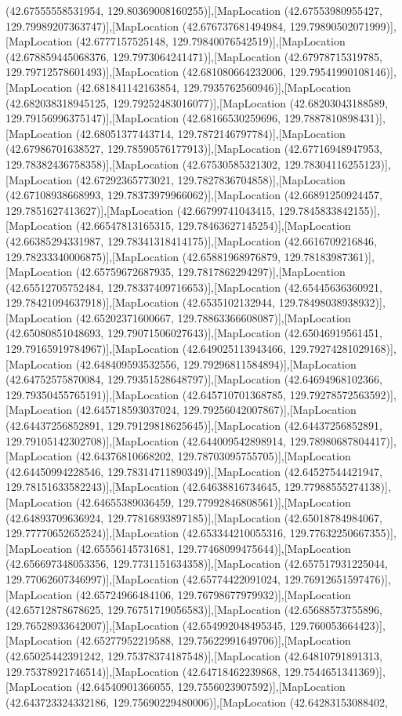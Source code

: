 (42.67555558531954, 129.80369008160255)],[MapLocation (42.67553980955427, 129.79989207363747)],[MapLocation (42.676737681494984, 129.79890502071999)],[MapLocation (42.6777157525148, 129.79840076542519)],[MapLocation (42.678859445068376, 129.7973064241471)],[MapLocation (42.67978715319785, 129.79712578601493)],[MapLocation (42.681080664232006, 129.79541990108146)],[MapLocation (42.681841142163854, 129.7935762560946)],[MapLocation (42.682038318945125, 129.79252483016077)],[MapLocation (42.68203043188589, 129.79156996375147)],[MapLocation (42.68166530259696, 129.7887810898431)],[MapLocation (42.68051377443714, 129.7872146797784)],[MapLocation (42.67986701638527, 129.78590576177913)],[MapLocation (42.67716948947953, 129.78382436758358)],[MapLocation (42.67530585321302, 129.78304116255123)],[MapLocation (42.67292365773021, 129.7827836704858)],[MapLocation (42.67108938668993, 129.78373979966062)],[MapLocation (42.66891250924457, 129.7851627413627)],[MapLocation (42.66799741043415, 129.7845833842155)],[MapLocation (42.66547813165315, 129.78463627145254)],[MapLocation (42.66385294331987, 129.78341318414175)],[MapLocation (42.6616709216846, 129.78233340006875)],[MapLocation (42.65881968976879, 129.78183987361)],[MapLocation (42.65759672687935, 129.7817862294297)],[MapLocation (42.65512705752484, 129.78337409716653)],[MapLocation (42.65445636360921, 129.78421094637918)],[MapLocation (42.6535102132944, 129.78498038938932)],[MapLocation (42.65202371600667, 129.78863366608087)],[MapLocation (42.65080851048693, 129.79071506027643)],[MapLocation (42.65046919561451, 129.79165919784967)],[MapLocation (42.649025113943466, 129.79274281029168)],[MapLocation (42.648409593532556, 129.79296811584894)],[MapLocation (42.64752575870084, 129.79351528648797)],[MapLocation (42.64694968102366, 129.79350455765191)],[MapLocation (42.645710701368785, 129.79278572563592)],[MapLocation (42.645718593037024, 129.79256042007867)],[MapLocation (42.64437256852891, 129.79129818625645)],[MapLocation (42.64437256852891, 129.79105142302708)],[MapLocation (42.644009542898914, 129.78980687804417)],[MapLocation (42.64376810668202, 129.78703095755705)],[MapLocation (42.64450994228546, 129.78314711890349)],[MapLocation (42.64527544421947, 129.78151633582243)],[MapLocation (42.64638816734645, 129.77988555274138)],[MapLocation (42.64655389036459, 129.77992846808561)],[MapLocation (42.64893709636924, 129.77816893897185)],[MapLocation (42.65018784984067, 129.77770652652524)],[MapLocation (42.653344210055316, 129.77632250667355)],[MapLocation (42.65556145731681, 129.77468099475644)],[MapLocation (42.656697348053356, 129.7731151634358)],[MapLocation (42.657517931225044, 129.77062607346997)],[MapLocation (42.65774422091024, 129.76912651597476)],[MapLocation (42.65724966484106, 129.76798677979932)],[MapLocation (42.65712878678625, 129.76751719056583)],[MapLocation (42.65688573755896, 129.76528933642007)],[MapLocation (42.654992048495345, 129.760053664423)],[MapLocation (42.65277952219588, 129.75622991649706)],[MapLocation (42.65025442391242, 129.75378374187548)],[MapLocation (42.64810791891313, 129.75378921746514)],[MapLocation (42.64718462239868, 129.7544651341369)],[MapLocation (42.64540901366055, 129.7556023907592)],[MapLocation (42.643723324332186, 129.75690229480006)],[MapLocation (42.64283153088402, 